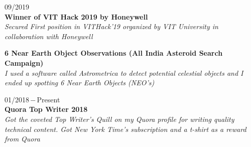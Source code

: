 \documentclass[a4paper, 12pt]{article}
\begin{document}
    \begin{flushleft}
        09/2019\\
        \textbf{Winner of VIT Hack 2019 by Honeywell}\\\textit{Secured First position in VITHack'19 organized by VIT University in collaboration with Honeywell}
    \end{flushleft}
    
    \begin{flushleft}
        \textbf{6 Near Earth Object Observations (All India Asteroid Search Campaign)}\\\textit{I used a software called Astrometrica to detect potential celestial objects and I ended up spotting 6 Near Earth Objects (NEO's)}
    \end{flushleft}
    
    \begin{flushleft}
        01/2018\,$-$\,Present\\
        \textbf{Quora Top Writer 2018}\\\textit{Got the coveted Top Writer's Quill on my Quora profile for writing quality technical content. Got New York Time's subscription and a t-shirt as a reward from Quora}
    \end{flushleft}
    
    \pagebreak
    
\end{document}
